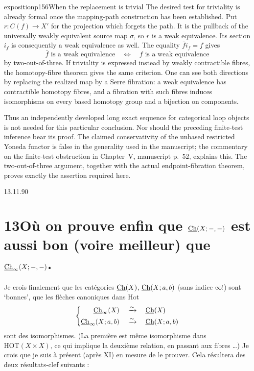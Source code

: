 \begin{dcomment}{exposition}{p156}{When the replacement is trivial}
The desired test for triviality is already formal once the mapping-path construction has been established. Put $r:C(f)\to X'$ for the projection which forgets the path. It is the pullback of the universally weakly equivalent source map $\sigma$, so $r$ is a weak equivalence. Its section $i_f$ is consequently a weak equivalence as well. The equality $\bar f i_f=f$ gives
\[
 \bar f\text{ is a weak equivalence}\quad\Longleftrightarrow\quad
 f\text{ is a weak equivalence}
\]
by two-out-of-three. If triviality is expressed instead by weakly contractible fibres, the homotopy-fibre theorem gives the same criterion. One can see both directions by replacing the realized map by a Serre fibration: a weak equivalence has contractible homotopy fibres, and a fibration with such fibres induces isomorphisms on every based homotopy group and a bijection on components.

Thus an independently developed long exact sequence for categorical loop objects is not needed for this particular conclusion. Nor should the preceding finite-test inference bear its proof. The claimed conservativity of the unbased restricted Yoneda functor is false in the generality used in the manuscript; the commentary on the finite-test obstruction in Chapter~V, manuscript p.~52, explains this. The two-out-of-three argument, together with the actual endpoint-fibration theorem, proves exactly the assertion required here.
\end{dcomment}


\begin{flushright}
\footnotesize 13.11.90
\end{flushright}

\section*{13\quad Où on prouve enfin que $\underline{\mathrm{Ch}}(X;-,-)$ est aussi bon (voire meilleur) que $\underline{\mathrm{Ch}}_\infty(X;-,-)$.}

Je crois finalement que les catégories $\underline{\mathrm{Ch}}(X)$, $\underline{\mathrm{Ch}}(X;a,b)$ (sans indice $\infty$!) sont `bonnes', que les flèches canoniques dans Hot
\[
\left\{
\begin{aligned}
\underline{\mathrm{Ch}}_\infty(X) \quad &\xrightarrow{\sim} \quad \underline{\mathrm{Ch}}(X)\\
\underline{\mathrm{Ch}}_\infty(X;a,b) \quad &\xrightarrow{\sim} \quad \underline{\mathrm{Ch}}(X;a,b)
\end{aligned}
\right.
\]
sont des isomorphismes. (La première est même isomorphisme dans $\mathrm{HOT}(X \times X)$, ce qui implique la deuxième relation, en passant aux fibres \dots) Je crois que je suis à présent (après XI) en mesure de le prouver. Cela résultera des deux résultats-clef suivants :

